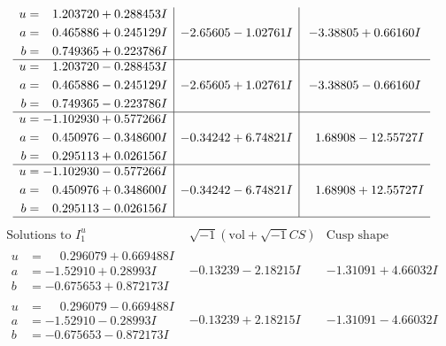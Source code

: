 \documentclass[1p]{elsarticle_modified}
\theoremstyle{definition}
\newcommand{\I}{\sqrt{-1}}
\begin{document}
$$\begin{array}{c|c|c}
\begin{aligned}
u &= \phantom{-}1.203720 + 0.288453 I \\
a &= \phantom{-}0.465886 + 0.245129 I \\
b &= \phantom{-}0.749365 + 0.223786 I\end{aligned}
 & -2.65605 - 1.02761 I & -3.38805 + 0.66160 I \\ \hline\begin{aligned}
u &= \phantom{-}1.203720 - 0.288453 I \\
a &= \phantom{-}0.465886 - 0.245129 I \\
b &= \phantom{-}0.749365 - 0.223786 I\end{aligned}
 & -2.65605 + 1.02761 I & -3.38805 - 0.66160 I \\ \hline\begin{aligned}
u &= -1.102930 + 0.577266 I \\
a &= \phantom{-}0.450976 - 0.348600 I \\
b &= \phantom{-}0.295113 + 0.026156 I\end{aligned}
 & -0.34242 + 6.74821 I & \phantom{-}1.68908 - 12.55727 I \\ \hline\begin{aligned}
u &= -1.102930 - 0.577266 I \\
a &= \phantom{-}0.450976 + 0.348600 I \\
b &= \phantom{-}0.295113 - 0.026156 I\end{aligned}
 & -0.34242 - 6.74821 I & \phantom{-}1.68908 + 12.55727 I\\
 \hline 
 \end{array}$$\newpage$$\begin{array}{c|c|c}  
\text{Solutions to }I^u_{1}& \I (\text{vol} + \sqrt{-1}CS) & \text{Cusp shape}\\
 \hline 
\begin{aligned}
u &= \phantom{-}0.296079 + 0.669488 I \\
a &= -1.52910 + 0.28993 I \\
b &= -0.675653 + 0.872173 I\end{aligned}
 & -0.13239 - 2.18215 I & -1.31091 + 4.66032 I \\ \hline\begin{aligned}
u &= \phantom{-}0.296079 - 0.669488 I \\
a &= -1.52910 - 0.28993 I \\
b &= -0.675653 - 0.872173 I\end{aligned}
 & -0.13239 + 2.18215 I & -1.31091 - 4.66032 I \\ \hline\begin{aligned}

\end{aligned}
\end{array}$$
\end{document}
